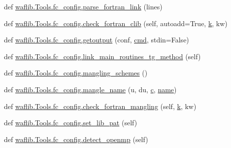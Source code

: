 \begin{DoxyCompactItemize}
\item 
def \hyperlink{namespacewaflib_1_1_tools_1_1fc__config_a643b036f881429dd3242675b282f853b}{waflib.\+Tools.\+fc\+\_\+config.\+parse\+\_\+fortran\+\_\+link} (lines)
\item 
def \hyperlink{namespacewaflib_1_1_tools_1_1fc__config_af4d3637a02c4f282d2005bc1cd87af6d}{waflib.\+Tools.\+fc\+\_\+config.\+check\+\_\+fortran\+\_\+clib} (self, autoadd=True, \hyperlink{rfft2d_test_m_l_8m_adc468c70fb574ebd07287b38d0d0676d}{k}, kw)
\item 
def \hyperlink{namespacewaflib_1_1_tools_1_1fc__config_a41ccbf12d86d6c945a6b8f4d598ab479}{waflib.\+Tools.\+fc\+\_\+config.\+getoutput} (conf, \hyperlink{sndfile__play_8m_adfc5ba7e22f5e4a6221c12a70503bef3}{cmd}, stdin=False)
\item 
def \hyperlink{namespacewaflib_1_1_tools_1_1fc__config_a046b800b80c2dcaa4c5ff10008814306}{waflib.\+Tools.\+fc\+\_\+config.\+link\+\_\+main\+\_\+routines\+\_\+tg\+\_\+method} (self)
\item 
def \hyperlink{namespacewaflib_1_1_tools_1_1fc__config_a851a07c412fad1fcfa59fd409981d936}{waflib.\+Tools.\+fc\+\_\+config.\+mangling\+\_\+schemes} ()
\item 
def \hyperlink{namespacewaflib_1_1_tools_1_1fc__config_ab08a4a190abfce7dc697bbfbfe6c5287}{waflib.\+Tools.\+fc\+\_\+config.\+mangle\+\_\+name} (u, du, \hyperlink{rfft2d_test_m_l_8m_ae0323a9039add2978bf5b49550572c7c}{c}, \hyperlink{lib_2expat_8h_a1b49b495b59f9e73205b69ad1a2965b0}{name})
\item 
def \hyperlink{namespacewaflib_1_1_tools_1_1fc__config_a6063b8d4b97d234df1b3c357918c07ae}{waflib.\+Tools.\+fc\+\_\+config.\+check\+\_\+fortran\+\_\+mangling} (self, \hyperlink{rfft2d_test_m_l_8m_adc468c70fb574ebd07287b38d0d0676d}{k}, kw)
\item 
def \hyperlink{namespacewaflib_1_1_tools_1_1fc__config_a5def4858c602d4c57dfc3aefe771e8b6}{waflib.\+Tools.\+fc\+\_\+config.\+set\+\_\+lib\+\_\+pat} (self)
\item 
def \hyperlink{namespacewaflib_1_1_tools_1_1fc__config_adebe873fd211b7a010ce5167e718f917}{waflib.\+Tools.\+fc\+\_\+config.\+detect\+\_\+openmp} (self)
\end{DoxyCompactItemize}
